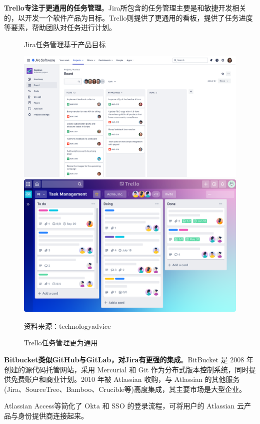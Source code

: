 \textbf{Trello专注于更通用的任务管理}。Jira所包含的任务管理主要是和敏捷开发相关的，以开发一个软件产品为目标。Trello则提供了更通用的看板，提供了任务进度等要素，帮助团队对任务进行计划。
\begin{figure}[H]
    \begin{minipage}{0.48\linewidth}
        \caption{Jira任务管理基于产品目标}
        \includegraphics[width=\linewidth]{img/jira.png}
    \end{minipage}
    \begin{minipage}{0.48\linewidth}
        \caption{Trello任务管理更为通用}
        \includegraphics[width=\linewidth]{img/Trello.png}
    \end{minipage}
    \footnotesize{资料来源：technologyadvice}
\end{figure}

\textbf{Bitbucket类似GitHub与GitLab，对Jira有更强的集成}。BitBucket 是 2008 年创建的源代码托管网站，采用 Mercurial 和 Git 作为分布式版本控制系统，同时提供免费账户和商业计划。2010 年被 Atlassian 收购，与 Atlassian 的其他服务(Jira、SourceTree、Bamboo、Crucible等)高度集成，其主要市场是大型企业。

Atlassian Access等简化了 Okta 和 SSO 的登录流程，可将用户的 Atlassian 云产品与身份提供商连接起来。
